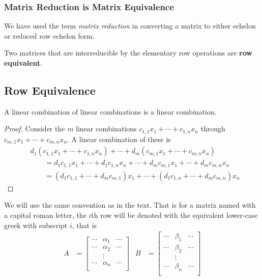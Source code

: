 \subsubsection{Matrix Reduction is Matrix Equivalence}

We have used the term \emph{matrix reduction} in converting a matrix to either echelon or reduced row echelon form.

\begin{definition}
Two matrices that are interreducible by the elementary row operations are \textbf{row equivalent}.
\end{definition}


\subsection{Row Equivalence}

\begin{lemma}
A linear combination of linear combinations is a linear combination.
\end{lemma}

\begin{proof}
Consider the $m$  linear combinations $c_{1,1} x_1 + \cdots + c_{1,n} x_n$ through $c_{m,1} x_1 + \cdots + c_{m,n} x_n$.  A linear combination of these is
%
\begin{align*}
& d_1 (c_{1,1} x_1 + \cdots + c_{1,n} x_n ) + \cdots + d_m (c_{m,1} x_1 + \cdots + c_{m,n} x_n) \\
& \qquad = d_1 c_{1,1} x_1 + \cdots + d_1 c_{1,n} x_n + \cdots + d_m c_{m,1} x_1 + \cdots + d_m c_{m,n} x_n \\
& \qquad = (d_1 c_{1,1} + \cdots + d_m c_{m,1}) x_1 + \cdots + (d_1 c_{1,n} + \cdots + d_m c_{m,n}) x_n
\end{align*}
\end{proof}

We will use the same convention as in the text.  That is for a matrix named with a capital roman letter, the $i$th row will be denoted with the equivalent lower-case greek with subscript $i$, that is
%
\begin{align*}
A & = \begin{bmatrix}
\cdots & \alpha_1 & \cdots \\
\cdots & \alpha_2 & \cdots \\
& \vdots & \\
\cdots & \alpha_n & \cdots \\
\end{bmatrix} &
B & = \begin{bmatrix}
\cdots & \beta_1 & \cdots \\
\cdots & \beta_2 & \cdots \\
& \vdots & \\
\cdots & \beta_n & \cdots \\
\end{bmatrix}
\end{align*}

